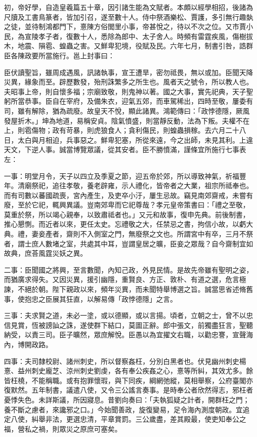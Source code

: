 \begin{pinyinscope}
初，帝好學，自造皇羲篇五十章，因引諸生能為文賦者。本頗以經學相招，後諸為尺牘及工書鳥篆者，皆加引召，遂至數十人。侍中祭酒樂松、賈護，多引無行趣埶之徒，並待制鴻都門下，憙陳方俗閭里小事，帝甚悅之，待以不次之位。又市賈小民，為宣陵孝子者，復數十人，悉除為郎中、太子舍人。時頻有雷霆疾風，傷樹拔木，地震、隕雹、蝗蟲之害。又鮮卑犯境，役賦及民。六年七月，制書引咎，誥群臣各陳政要所當施行。邕上封事曰：

臣伏讀聖旨，雖周成遇風，訊諸執事，宣王遭旱，密勿祗畏，無以或加。臣聞天降災異，緣象而至。辟歷數發，殆刑誅繁多之所生也。風者天之號令，所以教人也。夫昭事上帝，則自懷多福；宗廟致敬，則鬼神以著。國之大事，實先祀典，天子聖躬所當恭事。臣自在宰府，及備朱衣，迎氣五郊，而車駕稀出，四時至敬，屢委有司，雖有解除，猶為疏廢。故皇天不悅，顯此諸異。鴻範傳曰：「政悖德隱，厥風發屋折木。」坤為地道，易稱安貞。陰氣憤盛，則當靜反動，法為下叛。夫權不在上，則雹傷物；政有苛暴，則虎狼食人；貪利傷民，則蝗蟲損稼。去六月二十八日，太白與月相迫，兵事惡之。鮮卑犯塞，所從來遠，今之出師，未見其利。上違天文，下逆人事。誠當博覽眾議，從其安者。臣不勝憤滿，謹條宜所施行七事表左：

一事：明堂月令，天子以四立及季夏之節，迎五帝於郊，所以導致神氣，祈福豐年。清廟祭祀，追往孝敬，養老辟雍，示人禮化，皆帝者之大業，祖宗所祗奉也。而有司數以蕃國疏喪，宮內產生，及吏卒小汙，屢生忌故。竊見南郊齋戒，未嘗有廢，至於它祀，輒興異議。豈南郊卑而它祀尊哉？孝元皇帝策書曰：「禮之至敬，莫重於祭，所以竭心親奉，以致肅祗者也。」又元和故事，復申先典。前後制書，推心懇惻。而近者以來，更任太史。忘禮敬之大，任禁忌之書，拘信小故，以虧大典。禮，妻妾產者，齋則不入側室之門，無廢祭之文也。所謂宮中有卒，三月不祭者，謂士庶人數堵之室，共處其中耳，豈謂皇居之曠，臣妾之眾哉？自今齋制宜如故典，庶荅風霆災妖之異。

二事：臣聞國之將興，至言數聞，內知己政，外見民情。是故先帝雖有聖明之姿，而猶廣求得失。又因災異，援引幽隱，重賢良、方正、敦朴、有道之選，危言極諫，不絕於朝。陛下親政以來，頻年災異，而未聞特舉博選之旨。誠當思省述脩舊事，使抱忠之臣展其狂直，以解易傳「政悖德隱」之言。

三事：夫求賢之道，未必一塗，或以德顯，或以言揚。頃者，立朝之士，曾不以忠信見賞，恆被謗訕之誅，遂使群下結口，莫圖正辭。郎中張文，前獨盡狂言，聖聽納受，以責三司。臣子曠然，眾庶解悅。臣愚以為宜擢文右職，以勸忠謇，宣聲海內，博開政路。

四事：夫司隸校尉、諸州刺史，所以督察姦枉，分別白黑者也。伏見幽州刺史楊憙、益州刺史龐芝、涼州刺史劉虔，各有奉公疾姦之心，憙等所糾，其效尤多。餘皆枉橈，不能稱職。或有抱罪懷瑕，與下同疾，綱網弛縱，莫相舉察，公府臺閣亦復默然。五年制書，議遣八使，又令三公謠言奏事。是時奉公者欣然得志，邪枉者憂悸失色。未詳斯議，所因寢息。昔劉向奏曰：「夫執狐疑之計者，開群枉之門；養不斷之慮者，來讒邪之口。」今始聞善政，旋復變易，足令海內測度朝政。宜追定八使，糾舉非法，更選忠清，平章賞罰。三公歲盡，差其殿最，使吏知奉公之福，營私之禍，則眾災之原庶可塞矣。


\end{pinyinscope}
